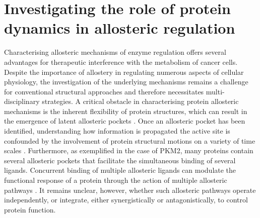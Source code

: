 \section{Investigating the role of protein dynamics in allosteric regulation}
Characterising allosteric mechanisms of enzyme regulation offers several advantages for therapeutic interference with the metabolism of cancer cells. Despite the importance of allostery in regulating numerous aspects of cellular physiology, the investigation of the underlying mechanisms remains a challenge for conventional structural approaches and therefore necessitates multi-disciplinary strategies. A critical obstacle in characterising protein allosteric mechanisms is the inherent flexibility of protein structures, which can result in the emergence of latent allosteric pockets \cite{Keedy:2018aa,Bowman:2015aa}. Once an allosteric pocket has been identified, understanding how information is propagated the active site is confounded by the involvement of protein structural motions on a variety of time scales \cite{Motlagh:2014aa}. Furthermore, as exemplified in the case of PKM2, many proteins contain several allosteric pockets that facilitate the simultaneous binding of several ligands. Concurrent binding of multiple allosteric ligands can modulate the functional response of a protein through the action of multiple allosteric pathways \cite{Sol:2009aa}. It remains unclear, however, whether such allosteric pathways operate independently, or integrate, either synergistically or antagonistically, to control protein function. 


